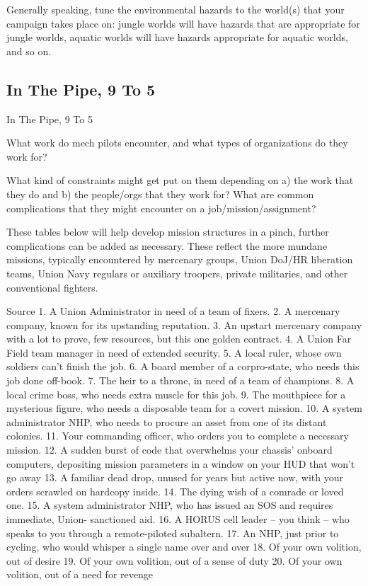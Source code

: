 Generally speaking, tune the environmental hazards to the world(s) that your campaign takes
place on: jungle worlds will have hazards that are appropriate for jungle worlds, aquatic worlds
will have hazards appropriate for aquatic worlds, and so on.



\subsection{In The Pipe, 9 To 5 }

In The Pipe, 9 To 5

What work do mech pilots encounter, and what types of organizations do they work for?

What kind of constraints might get put on them depending on a) the work that they do and b) the
people/orgs that they work for? What are common complications that they might encounter on a
job/mission/assignment?

These tables below will help develop mission structures in a pinch, further complications can be
added as necessary. These reflect the more mundane missions, typically encountered by
mercenary groups, Union DoJ/HR liberation teams, Union Navy regulars or auxiliary troopers,
private militaries, and other conventional fighters.

Source
    1.  A Union Administrator in need of a team of fixers.
    2.  A mercenary company, known for its upstanding reputation.
    3.  An upstart mercenary company with a lot to prove, few resources, but this one golden
        contract.
    4.  A Union Far Field team manager in need of extended security.
    5.  A local ruler, whose own soldiers can't finish the job.
    6.  A board member of a corpro-state, who needs this job done off-book.
    7.  The heir to a throne, in need of a team of champions.
    8.  A local crime boss, who needs extra muscle for this job.
    9.  The mouthpiece for a mysterious figure, who needs a disposable team for a covert
        mission.
    10. A system administrator NHP, who needs to procure an asset from one of its distant
        colonies.
    11. Your commanding officer, who orders you to complete a necessary mission.
    12. A sudden burst of code that overwhelms your chassis' onboard computers, depositing
        mission parameters in a window on your HUD that won't go away
    13. A familiar dead drop, unused for years but active now, with your orders scrawled on
        hardcopy inside.
    14. The dying wish of a comrade or loved one.
    15. A system administrator NHP, who has issued an SOS and requires immediate, Union-
        sanctioned aid.
    16. A HORUS cell leader -- you think -- who speaks to you through a remote-piloted subaltern.
    17. An NHP, just prior to cycling, who would whisper a single name over and over
    18. Of your own volition, out of desire
    19. Of your own volition, out of a sense of duty
    20. Of your own volition, out of a need for revenge

